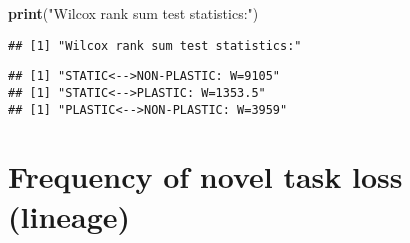 \documentclass[]{book}
\newenvironment{Shaded}{\begin{snugshade}}{\end{snugshade}}
\newcommand{\ControlFlowTok}[1]{\textcolor[rgb]{0.13,0.29,0.53}{\textbf{#1}}}
\newcommand{\DataTypeTok}[1]{\textcolor[rgb]{0.13,0.29,0.53}{#1}}
\newcommand{\DecValTok}[1]{\textcolor[rgb]{0.00,0.00,0.81}{#1}}
\newcommand{\KeywordTok}[1]{\textcolor[rgb]{0.13,0.29,0.53}{\textbf{#1}}}
\newcommand{\NormalTok}[1]{#1}
\newcommand{\OperatorTok}[1]{\textcolor[rgb]{0.81,0.36,0.00}{\textbf{#1}}}
\newcommand{\OtherTok}[1]{\textcolor[rgb]{0.56,0.35,0.01}{#1}}
\newcommand{\StringTok}[1]{\textcolor[rgb]{0.31,0.60,0.02}{#1}}
\begin{document}
\begin{Shaded}
\begin{Highlighting}[]
\KeywordTok{print}\NormalTok{(}\StringTok{"Wilcox rank sum test statistics:"}\NormalTok{)}
\end{Highlighting}
\end{Shaded}

\begin{verbatim}
## [1] "Wilcox rank sum test statistics:"
\end{verbatim}

\begin{Shaded}
\end{Shaded}

\begin{verbatim}
## [1] "STATIC<-->NON-PLASTIC: W=9105"
## [1] "STATIC<-->PLASTIC: W=1353.5"
## [1] "PLASTIC<-->NON-PLASTIC: W=3959"
\end{verbatim}

\hypertarget{frequency-of-novel-task-loss-lineage}{%
\section{Frequency of novel task loss (lineage)}\label{frequency-of-novel-task-loss-lineage}}
\end{document}
